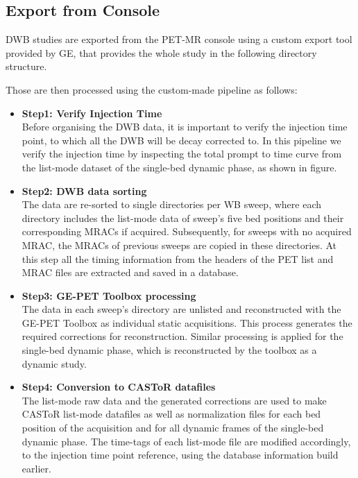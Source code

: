 \subsection{Export from Console}
DWB studies are exported from the PET-MR console using a custom export tool provided by GE, that provides the whole study in the following directory structure.  \\

Those are then processed using the custom-made pipeline as follows:
\begin{itemize}
    \item \textbf{Step1: Verify Injection Time} \\
    Before organising the DWB data, it is important to verify the injection time point, to which all the DWB will be decay corrected to. 
    In this pipeline we verify the injection time by inspecting the total prompt to time curve from the list-mode dataset of the single-bed dynamic phase, as shown in figure. 
    \item \textbf{Step2: DWB data sorting} \\
    The data are re-sorted to single directories per WB sweep, where each directory includes the list-mode data of sweep's five bed positions and their corresponding MRACs if acquired. Subsequently, for sweeps with no acquired MRAC, the MRACs of previous sweeps are copied in these directories.
    At this step all the timing information from the headers of the PET list and MRAC files are extracted and saved in a database. 
    \item \textbf{Step3: GE-PET Toolbox processing } \\
    The data in each sweep's directory are unlisted and reconstructed with the GE-PET Toolbox as individual static acquisitions. This process generates the required corrections for reconstruction. Similar processing is applied for the single-bed dynamic phase, which is reconstructed by the toolbox as a dynamic study.
    \item \textbf{Step4: Conversion to CASToR datafiles} \\
    The list-mode raw data and the generated corrections are used to make CASToR list-mode datafiles as well as normalization files for each bed position of the acquisition and for all dynamic frames of the single-bed dynamic phase. 
    The time-tags of each list-mode file are modified accordingly, to the injection time point reference, using the database information build earlier. 
\end{itemize}

